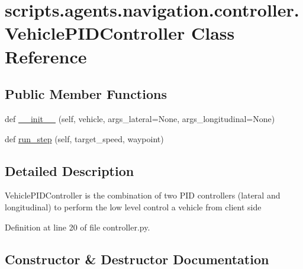 \hypertarget{classscripts_1_1agents_1_1navigation_1_1controller_1_1VehiclePIDController}{}\section{scripts.\+agents.\+navigation.\+controller.\+Vehicle\+P\+I\+D\+Controller Class Reference}
\label{classscripts_1_1agents_1_1navigation_1_1controller_1_1VehiclePIDController}
\subsection*{Public Member Functions}
\begin{DoxyCompactItemize}
\item 
def \hyperlink{classscripts_1_1agents_1_1navigation_1_1controller_1_1VehiclePIDController_a46957cfa95db8a8030be5bd50e0a131e}{\+\_\+\+\_\+init\+\_\+\+\_\+} (self, vehicle, args\+\_\+lateral=None, args\+\_\+longitudinal=None)
\item 
def \hyperlink{classscripts_1_1agents_1_1navigation_1_1controller_1_1VehiclePIDController_a4f79d7214620c693ee175895ab95c8e7}{run\+\_\+step} (self, target\+\_\+speed, waypoint)
\end{DoxyCompactItemize}


\subsection{Detailed Description}
\begin{DoxyVerb}VehiclePIDController is the combination of two PID controllers (lateral and longitudinal) to perform the
low level control a vehicle from client side
\end{DoxyVerb}
 

Definition at line 20 of file controller.\+py.



\subsection{Constructor \& Destructor Documentation}
\mbox{\label{classscripts_1_1agents_1_1navigation_1_1controller_1_1VehiclePIDController_a46957cfa95db8a8030be5bd50e0a131e}} 
